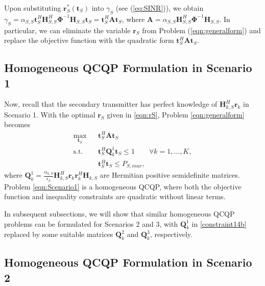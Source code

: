 \documentclass[twocolumn,10pt]{IEEEtran}
\theoremstyle{plain} \newtheorem{theorem}{Theorem}
\theoremstyle{plain} \newtheorem{proposition}{Proposition}
\theoremstyle{plain} \newtheorem{corollary}{Corollary}
\theoremstyle{remark} \newtheorem{remark}{Remark}
\theoremstyle{remark} \newtheorem{lemma}{Lemma}
\theoremstyle{plain} \newtheorem{definition}{Definition}
\theoremstyle{plain} \newtheorem{assumption}{Assumption}
\theoremstyle{plain} \newtheorem{fact}{Fact}
\begin{document}
Upon substituting $\mathbf{r}_S^*(\mathbf{t}_S)$ into $\gamma_S$ (see (\ref{eq:SINR})), we obtain $\gamma_S = \alpha_{S,S}\mathbf{t}_S^H\mathbf{H}_{S,S}^H\mathbf{\Phi}^{-1}\mathbf{H}_{S,S}\mathbf{t}_S = \mathbf{t}_S^H\mathbf{A}\mathbf{t}_S$, where $\mathbf{A}=\alpha_{S,S}\mathbf{H}_{S,S}^H\mathbf{\Phi}^{-1}\mathbf{H}_{S,S}$.  In particular, we can eliminate the variable $\mathbf{r}_S$ from Problem (\ref{eqn:generalform}) and replace the objective function with the quadratic form $\mathbf{t}_S^H\mathbf{A}\mathbf{t}_S$.

\subsection{Homogeneous QCQP Formulation in Scenario 1}\label{subsection:3-2}

Now, recall that the secondary transmitter has perfect knowledge of $\mathbf{H}_{k,S}^H \mathbf{r}_k$ in Scenario 1. With the optimal $\mathbf{r}_S$ given in \eqref{eqn:rS}, Problem \eqref{eqn:generalform} becomes
\begin{subequations}\label{eqn:Scenario1}
\begin{eqnarray}
\max_{\mathbf{t}_S} && \mathbf{t}_S^H\mathbf{A}\mathbf{t}_S \label{eqn:bf-obj} \\
\text{s.t. } && \mathbf{t}_S^H\mathbf{Q}_k^1\mathbf{t}_S \leq 1 \qquad \forall k=1,\ldots,K, \label{constraint14b}\\
&& \mathbf{t}_S^H\mathbf{t}_S \leq P_{S,max}, \label{eqn:bf-power}
\end{eqnarray}
\end{subequations}
where
$
\mathbf{Q}_k^1=\frac{\alpha_{k,S}}{\epsilon_k} \mathbf{H}_{k,S}^H \mathbf{r}_k \mathbf{r}_k^H \mathbf{H}_{k,S}
$
are Hermitian positive semidefinite matrices. Problem \eqref{eqn:Scenario1} is a homogeneous QCQP, where both the objective function and inequality constraints are quadratic without linear terms.

In subsequent subsections, we will show that similar homogeneous QCQP problems can be formulated for Scenarios 2 and 3, with $\mathbf{Q}_k^1$ in \eqref{constraint14b} replaced by some suitable matrices $\mathbf{Q}_k^2$ and $\mathbf{Q}_k^3$, respectively.

\subsection{Homogeneous QCQP Formulation in Scenario 2}\label{subsection:3-3}
\end{document}
